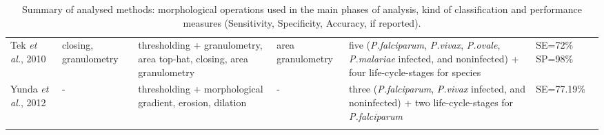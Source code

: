 \begin{longtable}{C{2.1cm} C{2.1cm} C{2.3cm} H C{2.7cm} C{2.2cm} }
    Tek \emph{et al.}, 2010  &
    	closing, granulometry &
    	thresholding + granulometry, area top-hat, closing, area granulometry &
    	area granulometry &
    	five (\emph{P.falciparum}, \emph{P.vivax}, \emph{P.ovale}, \emph{P.malariae} infected, and noninfected) +
    four life-cycle-stages for species &
    	SE=72\% SP=98\% \vspace{0.6cm} \\

    Yunda \emph{et al.}, 2012  &
    	- &
    	thresholding + morphological gradient, erosion, dilation  &
    	- &
    	three (\emph{P.falciparum}, \emph{P.vivax} infected, and noninfected) + two life-cycle-stages for \emph{P.falciparum}&
    	SE=77.19\% \\
    	  	
		 \hline
		
				
	\caption{Summary of analysed methods: morphological operations used in the main phases of analysis, kind of classification and performance measures (Sensitivity, Specificity, Accuracy, if reported).} %
	\label{tab:summary_table}
	\end{longtable}

	
